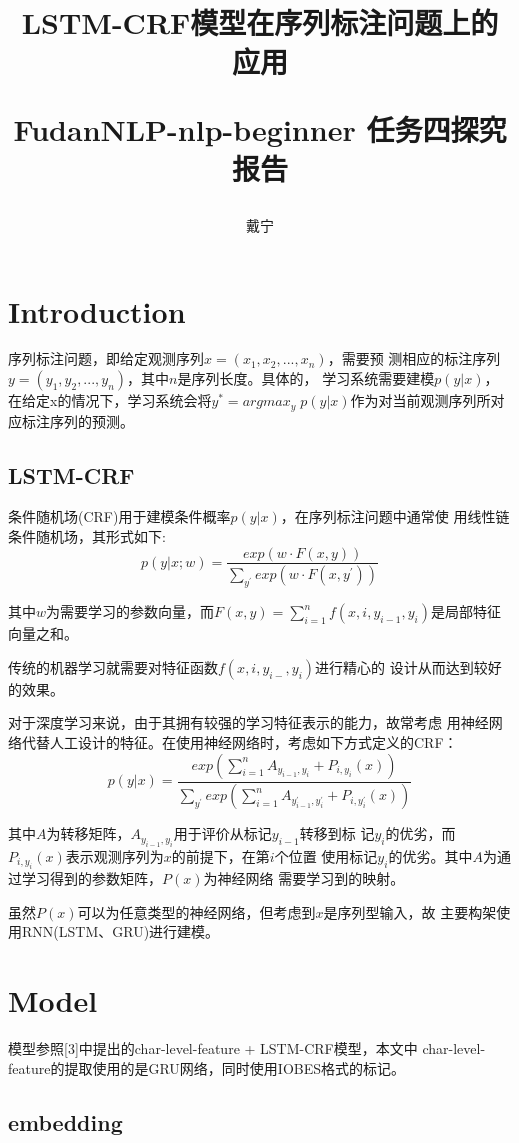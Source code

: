 \documentclass{article} %
\title{LSTM-CRF模型在序列标注问题上的应用\\
\begin{normalsize} FudanNLP-nlp-beginner 任务四探究报告 \end{normalsize}}
\subtitle{}
\author{
戴宁
}
\begin{document}
\maketitle

\section{Introduction}
\qquad 序列标注问题，即给定观测序列$x = (x_1, x_2, ..., x_n)$，需要预
测相应的标注序列$y = (y_1, y_2, ..., y_n)$，其中$n$是序列长度。具体的，
学习系统需要建模$p(y|x)$，在给定x的情况下，学习系统会将$y^* = argmax_y
\; p(y|x)$作为对当前观测序列所对应标注序列的预测。 

\subsection{LSTM-CRF}
\qquad 条件随机场(CRF)用于建模条件概率$p(y|x)$，在序列标注问题中通常使
用线性链条件随机场，其形式如下:$$p(y|x;w) = \frac{exp(w \cdot F(x,
  y))}{\sum_{y^{'}} exp(w \cdot F(x,y^{'}))}$$

\qquad 其中$w$为需要学习的参数向量，而$F(x,y) =
\sum_{i=1}^{n}f(x, i, y_{i-1}, y_i)$是局部特征向量之和。

\qquad 传统的机器学习就需要对特征函数$f(x, i, y_{i-}, y_i)$进行精心的
设计从而达到较好的效果。

\qquad 对于深度学习来说，由于其拥有较强的学习特征表示的能力，故常考虑
用神经网络代替人工设计的特征。在使用神经网络时，考虑如下方式定义的CRF：
$$p(y|x) = \frac{exp(\sum_{i=1}^{n}A_{y_{i-1}, y_i} + P_{i, y_i}(x))}
{\sum_{y^{'}}exp(\sum_{i=1}^{n}A_{y^{'}_{i-1}, y^{'}_i} + P_{i,
    y^{'}_i}(x))}$$

\qquad 其中$A$为转移矩阵，$A_{y_{i-1}, y_i}$用于评价从标记$y_{i-1}$转移到标
记$y_i$的优劣，而$P_{i, y_i}(x)$表示观测序列为$x$的前提下，在第$i$个位置
使用标记$y_i$的优劣。其中$A$为通过学习得到的参数矩阵，$P(x)$为神经网络
需要学习到的映射。

\qquad 虽然$P(x)$可以为任意类型的神经网络，但考虑到$x$是序列型输入，故
主要构架使用RNN(LSTM、GRU)进行建模。

\section{Model}
\qquad 模型参照[3]中提出的char-level-feature + LSTM-CRF模型，本文中
char-level-feature的提取使用的是GRU网络，同时使用IOBES格式的标记。

\subsection{embedding}
\end{document}
